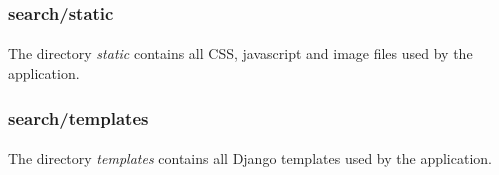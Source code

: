 \subsubsection{search/static}
\paragraph{}
The directory \textit{static} contains all CSS, javascript and image files used by the application.

\subsubsection{search/templates}
\paragraph{}
The directory \textit{templates} contains all Django templates used by the application.
